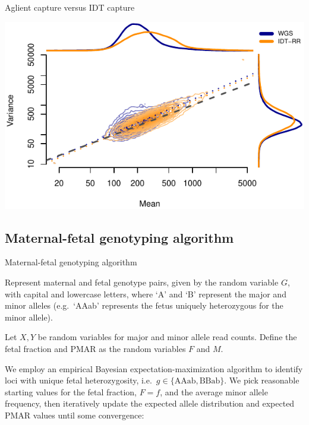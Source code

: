 \documentclass[
  10pt,
  ignorenonframetext,
  m]{beamer}
\begin{document}
\begin{frame}{Aglient capture versus IDT capture}

\begin{center}\includegraphics{defense_files/figure-beamer/mnVrComp-1} \end{center}

\end{frame}

\hypertarget{maternal-fetal-genotyping-algorithm}{%
\subsection{Maternal-fetal genotyping
algorithm}\label{maternal-fetal-genotyping-algorithm}}

\begin{frame}{Maternal-fetal genotyping algorithm}

Represent maternal and fetal genotype pairs, given by the random
variable \(G\), with capital and lowercase letters, where `A' and `B'
represent the major and minor alleles (e.g.~`AAab' represents the fetus
uniquely heterozygous for the minor allele).

Let \(X,Y\) be random variables for major and minor allele read counts.
Define the fetal fraction and PMAR as the random variables \(F\) and
\(M\).

We employ an empirical Bayesian expectation-maximization algorithm to
identify loci with unique fetal heterozygosity,
i.e.~\(g \in \{\text{AAab}, \text{BBab}\}\). We pick reasonable starting
values for the fetal fraction, \(F = f\), and the average minor allele
frequency, then iteratively update the expected allele distribution and
expected PMAR values until some convergence:

\end{frame}
\end{document}
